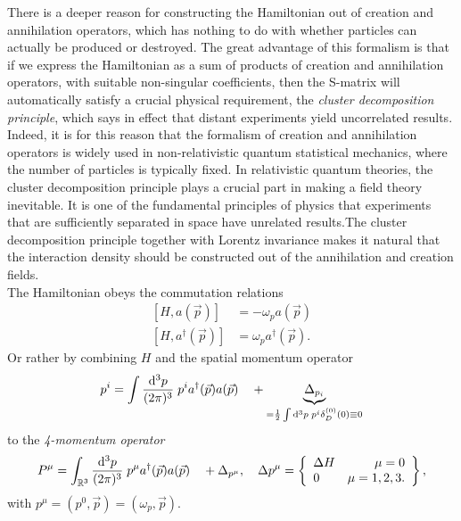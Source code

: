 There is a deeper reason for constructing the Hamiltonian out of creation and annihilation operators, which has nothing to do with whether particles can actually be produced or destroyed. The great advantage of this formalism is that if we express the Hamiltonian as a sum of products of creation and annihilation operators, with suitable non-singular coefficients, then the S-matrix will automatically satisfy a crucial physical requirement, the \emph{cluster decomposition principle}, which says in effect that distant experiments yield uncorrelated results. Indeed, it is for this reason that the formalism of creation and annihilation operators is widely used in non-relativistic quantum statistical mechanics, where the number of particles is typically fixed. In relativistic quantum theories, the cluster decomposition principle plays a crucial part in making a field theory inevitable. It is one of the fundamental principles of physics that experiments that are sufficiently separated in space have unrelated results.The cluster decomposition principle together with Lorentz invariance makes it natural that the interaction density should be constructed out of the annihilation and creation fields.\\
The Hamiltonian obeys the commutation relations
\begin{align}
	\left[H,a(\vec{p})\right] &= - \omega_p a(\vec{p}) \\
	\left[H,a^{\dagger}(\vec{p})\right] &= \omega_p a^{\dagger}(\vec{p}).
\end{align}
Or rather by combining $H$ and the spatial momentum operator
\begin{equation}
	p^i = \int \frac{\mathrm{d}^3 p}{(2 \pi)^3} \; p^i a^{\dagger} (\vec{p}) a(\vec{p}) \quad + \underbrace{\Delta_{p_i}}_{=\frac{1}{2} \int \mathrm{d}^3 p \; p^i \delta^{(0)}_D(0) \equiv 0 }
\end{equation}
to the \emph{4-momentum operator}
\begin{equation}
\label{eq:fourmomOperator}
	P^{\mu} = \int_{\mathbb{R}^3} \frac{\mathrm{d}^3 p}{(2 \pi)^3} \; p^{\mu} a^{\dagger}(\vec{p}) a(\vec{p}) \quad+ \Delta_{p^{\mu}}, \quad \Delta p^{\mu} = \left\{ \begin{array}{lr}
	\Delta H & \mu =0 \\
	0 & \mu=1,2,3.
	\end{array}\right\},
\end{equation}
with $p^{\mu} =(p^0,\vec{p})= (\omega_p, \vec{p})$.
